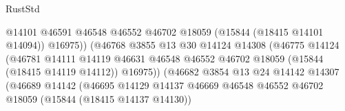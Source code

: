 \begin{lexlean}{RustStd}
\begin{coremodule}
                                                    @14101
                                                    @46591
                                                    @46548
                                                    @46552
                                                    @46702
                                                    @18059
                                                    (@15844 (@18415 @14101 @14094))
                                                    @16975))
                                                (@46768
                                                  @3855
                                                  @13
                                                  @30
                                                  @14124
                                                  @14308
                                                  (@46775
                                                    @14124
                                                    (@46781
                                                      @14111
                                                      @14119
                                                      @46631
                                                      @46548
                                                      @46552
                                                      @46702
                                                      @18059
                                                      (@15844 (@18415 @14119 @14112))
                                                      @16975))
                                                  (@46682
                                                    @3854
                                                    @13
                                                    @24
                                                    @14142
                                                    @14307
                                                    (@46689
                                                      @14142
                                                      (@46695
                                                        @14129
                                                        @14137
                                                        @46669
                                                        @46548
                                                        @46552
                                                        @46702
                                                        @18059
                                                        (@15844 (@18415 @14137 @14130))

\end{coremodule}
\end{lexlean}
